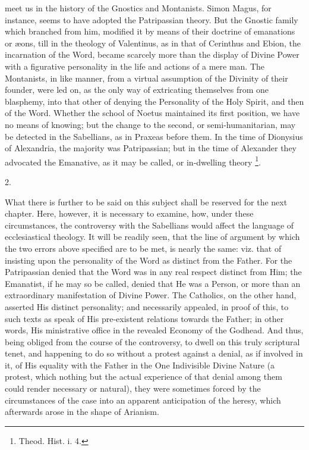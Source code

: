 meet us in the history of the Gnostics and Montanists. Simon
Magus, for instance, seems to have adopted the Patripassian theory.
But the Gnostic family which branched from him, modified it by means
of their doctrine of emanations or æons, till in the theology of
Valentinus, as in that of Cerinthus and Ebion, the incarnation of the
Word, became scarcely more than the display of Divine Power with a
figurative personality in the life and actions of a mere man. The
Montanists, in like manner, from a virtual assumption of the Divinity
of their founder, were led on, as the only way of extricating
themselves from one blasphemy, into that other of denying the
Personality of the Holy Spirit, and then of the Word. Whether the
school of Noetus maintained its first position, we have no means of
knowing; but the change to the second, or semi-humanitarian, may be
detected in the Sabellians, as in Praxeas before them. In the time of
Dionysius of Alexandria, the majority was Patripassian; but in the
time of Alexander they advocated the Emanative, as it may be called,
or in-dwelling theory \footnote{Theod. Hist. i. 4.}.

2.

What there is further to be said on this subject shall be reserved
for the next chapter. Here, however, it is necessary to examine, how,
under these circumstances, the controversy with the Sabellians would
affect the language of ecclesiastical theology. It will be readily
seen, that the line of argument by which the two errors above
specified are to be met, is nearly the same: viz. that of insisting
upon the personality of the Word as distinct from the Father.
For the Patripassian denied that the Word was in any real respect
distinct from Him; the Emanatist, if he may so be called, denied that
He was a Person, or more than an extraordinary manifestation of Divine
Power. The Catholics, on the other hand, asserted His distinct
personality; and necessarily appealed, in proof of this, to such texts
as speak of His pre-existent relations towards the Father; in other
words, His ministrative office in the revealed Economy of the Godhead.
And thus, being obliged from the course of the controversy, to dwell
on this truly scriptural tenet, and happening to do so without a
protest against a denial, as if involved in it, of His equality with
the Father in the One Indivisible Divine Nature (a protest, which
nothing but the actual experience of that denial among them could
render necessary or natural), they were sometimes forced by the
circumstances of the case into an apparent anticipation of the heresy,
which afterwards arose in the shape of Arianism.

